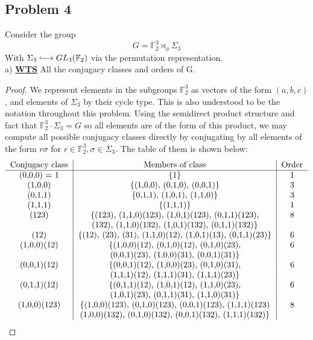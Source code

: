 \documentclass{article}
\newcommand{\bb}[1]{\mathbb{#1}}
\newcommand{\into}{\lhook\joinrel\longrightarrow}
\begin{document}
  
\vspace{0.3in}
\subsection*{Problem 4}
Consider the group
\[
  G = \bb{F}_{2}^{3} \rtimes_{\phi} \Sigma_{3}
\]
With $\Sigma_{3} \into GL_{3}(\bb{F}_{2})$ via the permutation representation. \\

a) \textbf{\underline{WTS}} All the conjugacy classes and orders of G.
\begin{proof}
  We represent elements in the subgroups $\bb{F}_{2}^{3}$ as vectors of the form $(a,b,c)$, and elements of $\Sigma_{3}$ by their cycle type. This is also understood to be the notation throughout this problem. Using the semidirect product structure and fact that $\bb{F}_{2}^{3} \cdot \Sigma_{3} = G$ so all elements are of the form of this product, we may compute all possible conjugacy classes directly by conjugating by all elements of the form $r \sigma$ for $r\in \bb{F}_{2}^{3}, \sigma \in \Sigma_{3}$. The table of them is shown below:
  \[
    \begin{tabular}{c|c|c}
      \text{Conjugacy class} & \text{Members of class} & \text{Order} \\
      \hline
      (0,0,0) = 1 & \{1\} & 1\\
      (1,0,0) & \{(1,0,0), (0,1,0), (0,0,1)\} & 3 \\
      (0,1,1) & \{0,1,1), (1,0,1), (1,1,0)\} & 3 \\
      (1,1,1) & \{(1,1,1)\} & 1 \\
      (123) & \{(123), (1,1,0)(123), (1,0,1)(123), (0,1,1)(123), & 8 \\
                             & (132), (1,1,0)(132), (1,0,1)(132), (0,1,1)(132)\} & \\
      (12) & \{(12), (23), (31), (1,1,0)(12), (1,0,1)(13), (0,1,1)(23)\} & 6 \\
      (1,0,0)(12) & \{(1,0,0)(12), (0,1,0)(12), (0,1,0)(23), &  6 \\
                             & (0,0,1)(23), (1,0,0)(31), (0,0,1)(31)\} & \\
      (0,0,1)(12) & \{(0,0,1)(12), (1,0,0)(23), (0,1,0)(31),  & 6 \\
      & (1,1,1)(12), (1,1,1)(31), (1,1,1)(23)\} & \\
      (0,1,1)(12) & \{(0,1,1)(12), (1,0,1)(12), (1,1,0)(23), & 6 \\
                             & (1,0,1)(23), (0,1,1)(31), (1,1,0)(31)\} &  \\
      (1,0,0)(123) & \{(1,0,0)(123), (0,1,0)(123), (0,0,1)(123), (1,1,1)(123) & 8 \\
                             & (1,0,0)(132), (0,1,0)(132), (0,0,1)(132), (1,1,1)(132)\} &
                                                                            \end{tabular}
  \]
\end{proof}
\end{document}
